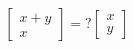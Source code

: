 \documentclass[preview]{standalone}
\begin{document}
\begin{align*}
\begin{bmatrix} x + y \\ x \end{bmatrix} = {}?\begin{bmatrix} x \\ y \end{bmatrix}
\end{align*}
\end{document}

